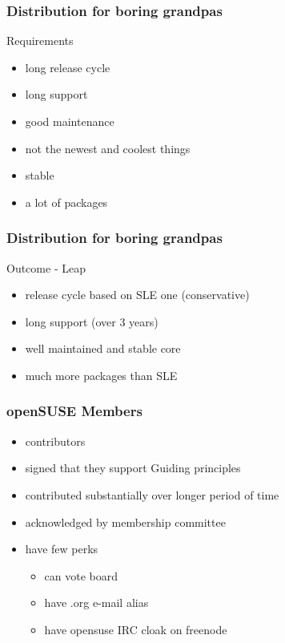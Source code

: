 \documentclass{beamer}
\begin{document}
\begin{frame}[t]
\frametitle{Distribution for boring grandpas}
Requirements
\begin{itemize}
\item long release cycle
\item long support
\item good maintenance
\item not the newest and coolest things
\item stable
\item a lot of packages
\end{itemize}
\end{frame}

\begin{frame}[t]
\frametitle{Distribution for boring grandpas}
Outcome - Leap
\begin{itemize}
\item release cycle based on SLE one (conservative)
\item long support (over 3 years)
\item well maintained and stable core
\item much more packages than SLE
\end{itemize}
\end{frame}



\begin{frame}[t]
\frametitle{openSUSE Members}
\begin{itemize}
\item contributors
\item signed that they support Guiding principles
\item contributed substantially over longer period of time
\item acknowledged by membership committee
\item have few perks
\begin{itemize}
\item can vote board
\item have \@opensuse.org e-mail alias
\item have opensuse IRC cloak on freenode
\end{itemize}
\end{itemize}
\end{frame}
\end{document}
